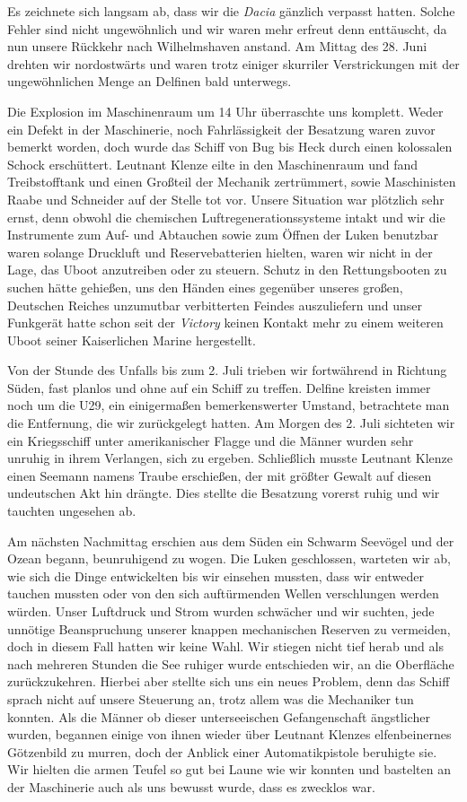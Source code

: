 \documentclass[a4paper]{memoir}
\begin{document}
Es zeichnete sich langsam ab, dass wir die \textit{Dacia} gänzlich verpasst hatten. Solche Fehler sind nicht ungewöhnlich und wir waren mehr erfreut denn enttäuscht, da nun unsere Rückkehr nach Wilhelmshaven anstand. Am Mittag des 28. Juni drehten wir nordostwärts und waren trotz einiger skurriler Verstrickungen mit der ungewöhnlichen Menge an Delfinen bald unterwegs.

Die Explosion im Maschinenraum um 14 Uhr überraschte uns komplett. Weder ein Defekt in der Maschinerie, noch Fahrlässigkeit der Besatzung waren zuvor bemerkt worden, doch wurde das Schiff von Bug bis Heck durch einen kolossalen Schock erschüttert. Leutnant Klenze eilte in den Maschinenraum und fand Treibstofftank und einen Großteil der Mechanik zertrümmert, sowie Maschinisten Raabe und Schneider auf der Stelle tot vor. Unsere Situation war plötzlich sehr ernst, denn obwohl die chemischen Luftregenerationssysteme intakt und wir die Instrumente zum Auf- und Abtauchen sowie zum Öffnen der Luken benutzbar waren solange Druckluft und Reservebatterien hielten, waren wir nicht in der Lage, das Uboot anzutreiben oder zu steuern. Schutz in den Rettungsbooten zu suchen hätte gehießen, uns den Händen eines gegenüber unseres großen, Deutschen Reiches unzumutbar verbitterten Feindes auszuliefern und unser Funkgerät hatte schon seit der \textit{Victory} keinen Kontakt mehr zu einem weiteren Uboot seiner Kaiserlichen Marine hergestellt.

Von der Stunde des Unfalls bis zum 2. Juli trieben wir fortwährend in Richtung Süden, fast planlos und ohne auf ein Schiff zu treffen. Delfine kreisten immer noch um die U29, ein einigermaßen bemerkenswerter Umstand, betrachtete man die Entfernung, die wir zurückgelegt hatten. Am Morgen des 2. Juli sichteten wir ein Kriegsschiff unter amerikanischer Flagge und die Männer wurden sehr unruhig in ihrem Verlangen, sich zu ergeben. Schließlich musste Leutnant Klenze einen Seemann namens Traube erschießen, der mit größter Gewalt auf diesen undeutschen Akt hin drängte. Dies stellte die Besatzung vorerst ruhig und wir tauchten ungesehen ab.

Am nächsten Nachmittag erschien aus dem Süden ein Schwarm Seevögel und der Ozean begann, beunruhigend zu wogen. Die Luken geschlossen, warteten wir ab, wie sich die Dinge entwickelten bis wir einsehen mussten, dass wir entweder tauchen mussten oder von den sich auftürmenden Wellen verschlungen werden würden. Unser Luftdruck und Strom wurden schwächer und wir suchten, jede unnötige Beanspruchung unserer knappen mechanischen Reserven zu vermeiden, doch in diesem Fall hatten wir keine Wahl. Wir stiegen nicht tief herab und als nach mehreren Stunden die See ruhiger wurde entschieden wir, an die Oberfläche zurückzukehren. Hierbei aber stellte sich uns ein neues Problem, denn das Schiff sprach nicht auf unsere Steuerung an, trotz allem was die Mechaniker tun konnten. Als die Männer ob dieser unterseeischen Gefangenschaft ängstlicher wurden, begannen einige von ihnen wieder über Leutnant Klenzes elfenbeinernes Götzenbild zu murren, doch der Anblick einer Automatikpistole beruhigte sie. Wir hielten die armen Teufel so gut bei Laune wie wir konnten und bastelten an der Maschinerie auch als uns bewusst wurde, dass es zwecklos war.
\end{document}
